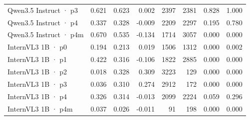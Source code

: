 \begin{tabular}{lrrrrrrr}
Qwen3.5 Instruct · p3 & 0.621 & 0.623 & 0.002 & 2397 & 2381 & 0.828 & 1.000 \\
Qwen3.5 Instruct · p4 & 0.337 & 0.328 & -0.009 & 2209 & 2297 & 0.195 & 0.780 \\
Qwen3.5 Instruct · p4m & 0.670 & 0.535 & -0.134 & 1714 & 3057 & 0.000 & 0.000 \\
InternVL3 1B · p0 & 0.194 & 0.213 & 0.019 & 1506 & 1312 & 0.000 & 0.002 \\
InternVL3 1B · p1 & 0.422 & 0.316 & -0.106 & 1822 & 2885 & 0.000 & 0.000 \\
InternVL3 1B · p2 & 0.018 & 0.328 & 0.309 & 3223 & 129 & 0.000 & 0.000 \\
InternVL3 1B · p3 & 0.036 & 0.310 & 0.274 & 2912 & 172 & 0.000 & 0.000 \\
InternVL3 1B · p4 & 0.326 & 0.314 & -0.013 & 2099 & 2224 & 0.059 & 0.296 \\
InternVL3 1B · p4m & 0.037 & 0.026 & -0.011 & 91 & 198 & 0.000 & 0.000 \\
\bottomrule
\end{tabular}
